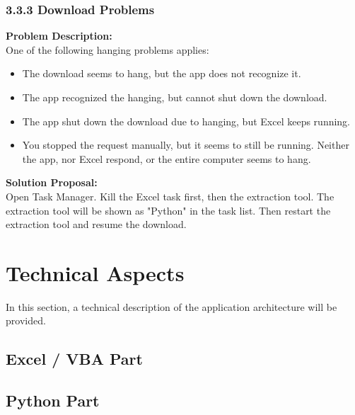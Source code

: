 \subsubsection{3.3.3 Download Problems}
\textbf{Problem Description: }  \\
One of the following hanging problems applies: 
\begin{itemize}
	\item The download seems to hang, but the app does not recognize it. 
	\item The app recognized the hanging, but cannot shut down the download. 
	\item The app shut down the download due to hanging, but Excel keeps running. 
	\item You stopped the request manually, but it seems to still be running. 
	Neither the app, nor Excel respond, or the entire computer seems to hang. 
\end{itemize} 
\textbf{Solution Proposal:} \\
Open Task Manager. Kill the Excel task first, then the extraction tool. The extraction tool will be shown as "Python" in the task list. Then restart the extraction tool and resume the download. 

\section{Technical Aspects}
In this section, a technical description of the application architecture will be provided. 

\subsection{Excel / VBA Part}



\subsection{Python Part}









